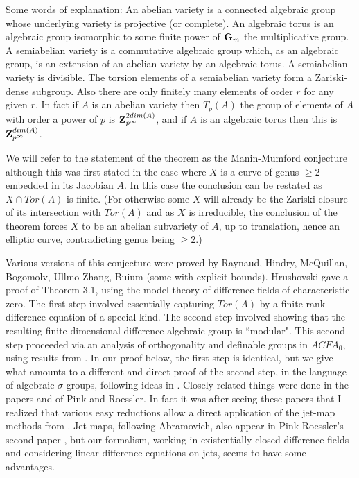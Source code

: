 Some words of explanation: An abelian variety
is a connected algebraic group whose underlying
variety is projective (or complete). An
algebraic torus is an algebraic group
isomorphic to some finite power of ${\bf
G}_{m}$ the multiplicative group. A
semiabelian variety is a commutative algebraic
group which, as an algebraic group,
is an extension of an abelian variety by an
algebraic torus. A semiabelian variety is
divisible. The torsion elements of a
semiabelian variety form a Zariski-dense
subgroup. Also there are only finitely many
elements of order
$r$ for any given $r$. In fact if $A$ is an
abelian variety then $T_{p}(A)$ the group of
elements of $A$ with order a power of $p$ is
${\bf Z}_{p^{\infty}}^{2dim(A)}$, and if $A$
is an algebraic torus then this is ${\bf
Z}_{p^{\infty}}^{dim(A)}$.

We will refer to the
statement of the theorem as the Manin-Mumford
conjecture although this was first stated in
the case where $X$ is a curve of genus $\geq
2$ embedded in its Jacobian $A$. In
this case the conclusion can be restated as
$X\cap Tor(A)$ is finite. (For otherwise some
$X$ will already be the Zariski closure of its
intersection with $Tor(A)$ and as $X$ is
irreducible, the conclusion of the theorem
forces $X$ to be an abelian subvariety of $A$,
up to translation, hence an elliptic curve,
contradicting genus being $\geq 2$.)

Various versions of this conjecture were
proved by Raynaud, Hindry, McQuillan,
Bogomolv, Ullmo-Zhang, Buium (some with
explicit bounds). Hrushovski
\cite{Hrushovski-MM} gave a proof of
Theorem 3.1, using the model theory of
difference fields of characteristic zero. The
first step involved essentially capturing
$Tor(A)$ by a finite rank difference equation
of a special kind. The second step involved
showing that the resulting finite-dimensional
difference-algebraic group is ``modular".
This second step proceeded via an analysis of
orthogonality and definable groups in
$ACFA_{0}$, using results from
\cite{C-H}. In our proof
below, the first step is identical, but we
give what amounts to a different and direct
proof of the second step, in the language of
algebraic $\sigma$-groups, following ideas
in
\cite{Pillay-Ziegler}. Closely related things
were done in the papers
\cite{Pink-Roessler1} and
\cite{Pink-Roessler2} of Pink and Roessler. In
fact it was after seeing these papers that I
realized that various easy reductions allow a
direct application of the jet-map methods
from \cite{Pillay-Ziegler}. Jet maps,
following Abramovich, also appear in
Pink-Roessler's second paper
\cite{Pink-Roessler2}, but our formalism,
working in existentially closed difference
fields and considering linear difference
equations on jets, seems to have some
advantages.
